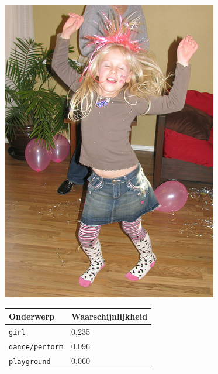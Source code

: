 \begin{figure}[h]
    \centering
    \begin{minipage}[t]{.5\linewidth}
    \centering
    \vspace{0pt}
    \includegraphics[width=\textwidth]{Images/LDA/2282260240.jpg}
    \end{minipage}\hfill
    \begin{minipage}[]{.5\textwidth}
    \centering
    \vspace{0pt}
    \begin{tabular}{ll}
            Onderwerp                           & Waarschijnlijkheid\\
            \hline
            \texttt{girl}             & 0,235 \\
            \texttt{dance/perform}                   & 0,096 \\
            \texttt{playground}                 & 0,060 \\

\end{tabular}
\end{minipage}
\end{figure}
